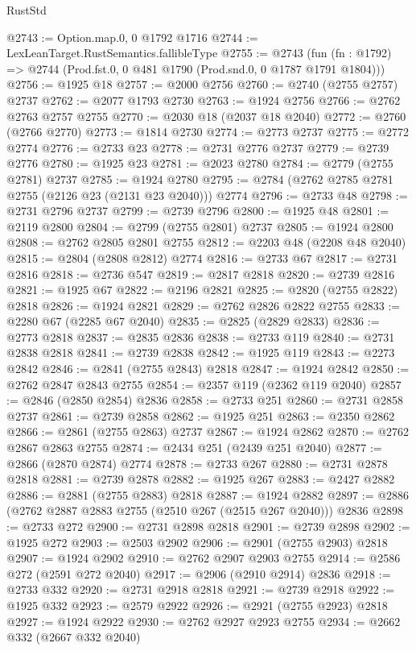\begin{lexlean}{RustStd}
\begin{coremodule}
@2743 := Option.map.{0, 0} @1792 @1716
@2744 := LexLeanTarget.RustSemantics.fallibleType
@2755 := @2743
    (fun (fn : @1792) => @2744 (Prod.fst.{0, 0} @481 @1790 (Prod.snd.{0, 0} @1787 @1791 @1804)))
@2756 := @1925 @18
@2757 := @2000 @2756
@2760 := @2740 (@2755 @2757) @2737
@2762 := @2077 @1793 @2730
@2763 := @1924 @2756
@2766 := @2762 @2763 @2757 @2755
@2770 := @2030 @18 (@2037 @18 @2040)
@2772 := @2760 (@2766 @2770)
@2773 := @1814 @2730
@2774 := @2773 @2737
@2775 := @2772 @2774
@2776 := @2733 @23
@2778 := @2731 @2776 @2737
@2779 := @2739 @2776
@2780 := @1925 @23
@2781 := @2023 @2780
@2784 := @2779 (@2755 @2781) @2737
@2785 := @1924 @2780
@2795 := @2784 (@2762 @2785 @2781 @2755 (@2126 @23 (@2131 @23 @2040))) @2774
@2796 := @2733 @48
@2798 := @2731 @2796 @2737
@2799 := @2739 @2796
@2800 := @1925 @48
@2801 := @2119 @2800
@2804 := @2799 (@2755 @2801) @2737
@2805 := @1924 @2800
@2808 := @2762 @2805 @2801 @2755
@2812 := @2203 @48 (@2208 @48 @2040)
@2815 := @2804 (@2808 @2812) @2774
@2816 := @2733 @67
@2817 := @2731 @2816
@2818 := @2736 @547
@2819 := @2817 @2818
@2820 := @2739 @2816
@2821 := @1925 @67
@2822 := @2196 @2821
@2825 := @2820 (@2755 @2822) @2818
@2826 := @1924 @2821
@2829 := @2762 @2826 @2822 @2755
@2833 := @2280 @67 (@2285 @67 @2040)
@2835 := @2825 (@2829 @2833)
@2836 := @2773 @2818
@2837 := @2835 @2836
@2838 := @2733 @119
@2840 := @2731 @2838 @2818
@2841 := @2739 @2838
@2842 := @1925 @119
@2843 := @2273 @2842
@2846 := @2841 (@2755 @2843) @2818
@2847 := @1924 @2842
@2850 := @2762 @2847 @2843 @2755
@2854 := @2357 @119 (@2362 @119 @2040)
@2857 := @2846 (@2850 @2854) @2836
@2858 := @2733 @251
@2860 := @2731 @2858 @2737
@2861 := @2739 @2858
@2862 := @1925 @251
@2863 := @2350 @2862
@2866 := @2861 (@2755 @2863) @2737
@2867 := @1924 @2862
@2870 := @2762 @2867 @2863 @2755
@2874 := @2434 @251 (@2439 @251 @2040)
@2877 := @2866 (@2870 @2874) @2774
@2878 := @2733 @267
@2880 := @2731 @2878 @2818
@2881 := @2739 @2878
@2882 := @1925 @267
@2883 := @2427 @2882
@2886 := @2881 (@2755 @2883) @2818
@2887 := @1924 @2882
@2897 := @2886 (@2762 @2887 @2883 @2755 (@2510 @267 (@2515 @267 @2040))) @2836
@2898 := @2733 @272
@2900 := @2731 @2898 @2818
@2901 := @2739 @2898
@2902 := @1925 @272
@2903 := @2503 @2902
@2906 := @2901 (@2755 @2903) @2818
@2907 := @1924 @2902
@2910 := @2762 @2907 @2903 @2755
@2914 := @2586 @272 (@2591 @272 @2040)
@2917 := @2906 (@2910 @2914) @2836
@2918 := @2733 @332
@2920 := @2731 @2918 @2818
@2921 := @2739 @2918
@2922 := @1925 @332
@2923 := @2579 @2922
@2926 := @2921 (@2755 @2923) @2818
@2927 := @1924 @2922
@2930 := @2762 @2927 @2923 @2755
@2934 := @2662 @332 (@2667 @332 @2040)

\end{coremodule}
\end{lexlean}
